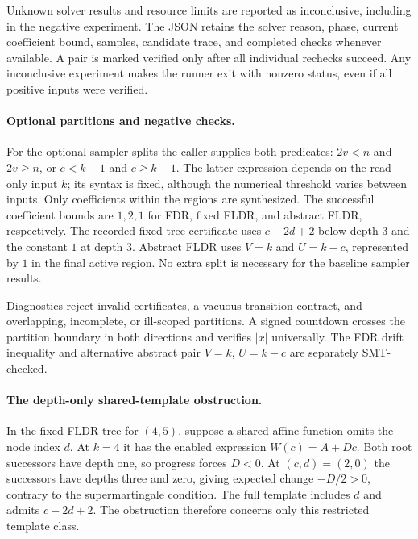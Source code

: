 Unknown solver results and resource limits are reported as inconclusive,
including in the negative experiment. The JSON retains the solver reason,
phase, current coefficient bound, samples, candidate trace, and completed
checks whenever available. A pair is marked verified only after all
individual rechecks succeed. Any inconclusive experiment makes the runner
exit with nonzero status, even if all positive inputs were verified.

\paragraph{Optional partitions and negative checks.}
For the optional sampler splits the caller supplies both predicates:
$2v<n$ and $2v\geq n$, or $c<k-1$ and $c\geq k-1$.
The latter expression depends on the read-only input $k$; its syntax is
fixed, although the numerical threshold varies between inputs.
Only coefficients within the regions are synthesized.
The successful coefficient bounds are $1,2,1$ for FDR, fixed FLDR,
and abstract FLDR, respectively. The recorded fixed-tree certificate uses $c-2d+2$
below depth $3$ and the constant $1$ at depth $3$. Abstract FLDR uses $V=k$ and
$U=k-c$, represented by $1$ in the final active region. No extra split
is necessary for the baseline sampler results.

Diagnostics reject invalid certificates, a vacuous transition contract,
and overlapping, incomplete, or ill-scoped partitions. A signed countdown
crosses the partition boundary in both directions and verifies $|x|$
universally. The FDR drift inequality and alternative abstract pair
$V=k$, $U=k-c$ are separately SMT-checked.

\paragraph{The depth-only shared-template obstruction.}
In the fixed FLDR tree for $(4,5)$, suppose a shared affine function
omits the node index $d$. At $k=4$ it has the enabled expression
$W(c)=A+Dc$. Both root successors have depth one, so progress forces
$D<0$. At $(c,d)=(2,0)$ the successors have depths three and zero,
giving expected change $-D/2>0$, contrary to the supermartingale
condition. The full template includes $d$ and admits $c-2d+2$.
The obstruction therefore concerns only this restricted template class.

